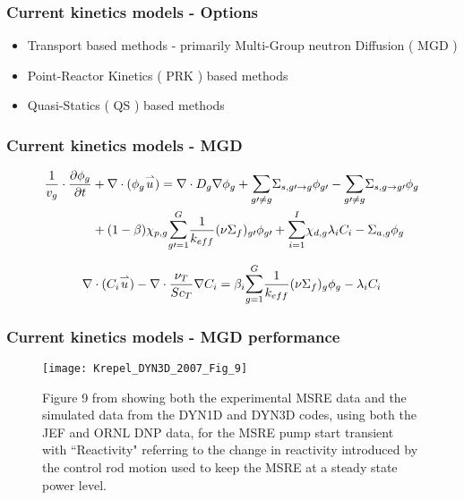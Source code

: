 \documentclass{beamer}
\begin{document}
\begin{frame}
\frametitle{Current kinetics models - Options}

    \begin{itemize}
        \item Transport based methods - primarily Multi-Group neutron Diffusion
                ( MGD )
        \item Point-Reactor Kinetics ( PRK ) based methods
        \item Quasi-Statics ( QS ) based methods
    \end{itemize}

\end{frame}

\begin{frame}
\frametitle{Current kinetics models - MGD}

\begin{equation}
\label{eq:mgd}
\begin{split}
\frac{1}{v_{g}} \cdot \frac{\partial \phi_{g}}{\partial t} &+ \nabla \cdot
    (\phi_{g} \overset{\rightharpoonup}u) = \nabla \cdot D_{g} \nabla \phi_{g}
    + \mathlarger{\sum}_{g \prime \not= g} \Sigma_{s,g \prime \rightarrow g}
    \phi_{g \prime} - \mathlarger{\sum}_{g \prime \not= g} 
    \Sigma_{s,g \rightarrow g \prime} \phi_{g} \\
    &+ (1-\beta)\chi_{p,g}
    \mathlarger{\sum}_{g \prime = 1}^{G}\frac{1}{k_{eff}}
    (\nu \Sigma_{f})_{g \prime}\phi_{g\prime} + 
    \mathlarger{\sum}_{i = 1}^{I}\chi_{d,g}\lambda_{i}C_{i} 
     - \Sigma_{a,g}\phi_{g}
\end{split}
\end{equation}

\begin{equation}
\label{eq:mgd_dnp}
\nabla \cdot (C_{i} \overset{\rightharpoonup}u) - 
    \nabla \cdot \frac{\nu_{T}}{Sc_{T}}\nabla C_{i}
    = \beta_{i} \mathlarger{\sum}_{g = 1}^{G} \frac{1}{k_{eff}} 
    (\nu \Sigma_{f})_{g} \phi_{g} - \lambda_{i} C_{i}
\end{equation}

\end{frame}

\begin{frame}
\frametitle{Current kinetics models - MGD performance}

    \begin{figure}
        \centering
        \texttt{[image: Krepel\_DYN3D\_2007\_Fig\_9]}
   \caption{Figure 9 from \cite{krepel_dyn3d-msr_2007} showing both the experimental MSRE data
   and the simulated data from the DYN1D and DYN3D codes, using both the JEF and ORNL DNP data, for
   the MSRE pump start transient with ``Reactivity" referring to the change in reactivity introduced
   by the control rod motion used to keep the MSRE at a steady state power level.} 
   \label{fig:krepel_dyn3d_msre_pump_start}
        \label{fig:krepel_dyn3d_mgd}
    \end{figure}

\end{frame}
\end{document}
